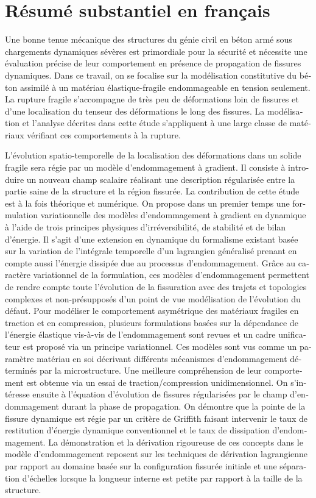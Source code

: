 \chapter{Résumé substantiel en français}
\begin{otherlanguage}{french}
Une bonne tenue mécanique des structures du génie civil en béton armé sous chargements dynamiques sévères est primordiale pour la sécurité et nécessite une évaluation précise de leur comportement en présence de propagation de fissures dynamiques. Dans ce travail, on se focalise sur la modélisation constitutive du béton assimilé à un matériau élastique-fragile endommageable en tension seulement. La rupture fragile s'accompagne de très peu de déformations loin de fissures et d'une localisation du tenseur des déformations le long des fissures. La modélisation et l'analyse décrites dans cette étude s'appliquent à une large classe de matériaux vérifiant ces comportements à la rupture.

L'évolution spatio-temporelle de la localisation des déformations dans un solide fragile sera régie par un modèle d'endommagement à gradient. Il consiste à introduire un nouveau champ scalaire réalisant une description régularisée entre la partie saine de la structure et la région fissurée. La contribution de cette étude est à la fois théorique et numérique. On propose dans un premier temps une formulation variationnelle des modèles d'endommagement à gradient en dynamique à l'aide de trois principes physiques d'irréversibilité, de stabilité et de bilan d'énergie. Il s'agit d'une extension en dynamique du formalisme existant basée sur la variation de l'intégrale temporelle d'un lagrangien généralisé prenant en compte aussi l'énergie dissipée due au processus d'endommagement. Grâce au caractère variationnel de la formulation, ces modèles d'endommagement permettent de rendre compte toute l'évolution de la fissuration avec des trajets et topologies complexes et non-présupposés d'un point de vue modélisation de l'évolution du défaut. Pour modéliser le comportement asymétrique des matériaux fragiles en traction et en compression, plusieurs formulations basées sur la dépendance de l'énergie élastique vis-à-vis de l'endommagement sont revues et un cadre unificateur est proposé via un principe variationnel. Ces modèles sont vus comme un paramètre matériau en soi décrivant différents mécanismes d'endommagement déterminés par la microstructure. Une meilleure compréhension de leur comportement est obtenue via un essai de traction/compression unidimensionnel. On s'intéresse ensuite à l'équation d'évolution de fissures régularisées par le champ d'endommagement durant la phase de propagation. On démontre que la pointe de la fissure dynamique est régie par un critère de Griffith faisant intervenir le taux de restitution d'énergie dynamique conventionnel et le taux de dissipation d'endommagement. La démonstration et la dérivation rigoureuse de ces concepts dans le modèle d'endommagement reposent sur les techniques de dérivation lagrangienne par rapport au domaine basée sur la configuration fissurée initiale et une séparation d'échelles lorsque la longueur interne est petite par rapport à la taille de la structure.


\end{otherlanguage}
